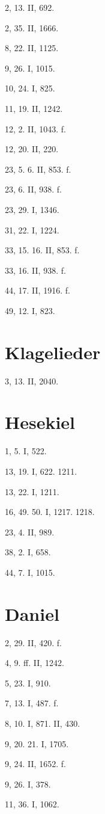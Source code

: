 2, 13. II, 692.

2, 35. II, 1666.

8, 22. II, 1125.

9, 26. I, 1015.

10, 24. I, 825.

11, 19. II, 1242.

12, 2. II, 1043. f.

12, 20. II, 220.

23, 5. 6. II, 853. f.

23, 6. II, 938. f.

23, 29. I, 1346.

31, 22. I, 1224.

33, 15. 16. II, 853. f.

33, 16. II, 938. f.

44, 17. II, 1916. f.

49, 12. I, 823.

\section{Klagelieder}

3, 13. II, 2040.

\section{Hesekiel}

1, 5. I, 522.

13, 19. I, 622. 1211.

13, 22. I, 1211.

16, 49. 50. I, 1217. 1218.

23, 4. II, 989.

38, 2. I, 658.

44, 7. I, 1015.

\section{Daniel}

2, 29. II, 420. f.

4, 9. ff. II, 1242.

5, 23. I, 910.

7, 13. I, 487. f.

8, 10. I, 871. II, 430.

9, 20. 21. I, 1705.

9, 24. II, 1652. f.

9, 26. I, 378.

11, 36. I, 1062.

